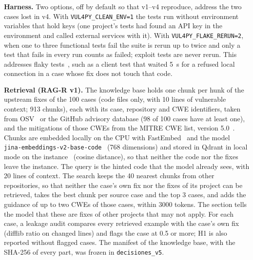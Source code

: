 \documentclass[ai,article,submit,oneauthor]{Definitions/mdpi}
\begin{document}
\textbf{Harness.} Two options, off by default so that v1--v4 reproduce, address the two cases lost in v4. With \texttt{VUL4PY\_CLEAN\_ENV=1} the tests run without environment variables that hold keys (one project's tests had found an API key in the environment and called external services with it). With \texttt{VUL4PY\_FLAKE\_RERUN=2}, when one to three functional tests fail the suite is rerun up to twice and only a test that fails in every run counts as failed; exploit tests are never rerun. This addresses flaky tests~\cite{Luo2014EmpiricalAnalysisFlaky}, such as a client test that waited 5~s for a refused local connection in a case whose fix does not touch that code.

\textbf{Retrieval (RAG-R v1).} The knowledge base holds one chunk per hunk of the upstream fixes of the 100 cases (code files only, with 10 lines of vulnerable context; 913 chunks), each with its case, repository and CWE identifiers, taken from OSV~\cite{OpenSSF2026OsvSchema} or the GitHub advisory database (98 of 100 cases have at least one), and the mitigations of those CWEs from the MITRE CWE list, version 5.0~\cite{MITRE2026CweList}. Chunks are embedded locally on the CPU with FastEmbed~\cite{Qdrant2026FastEmbed} and the model \texttt{jina-embeddings-v2-base-code}~\cite{Gunther2023JinaEmbeddings2} (768 dimensions) and stored in Qdrant in local mode on the instance~\cite{Qdrant2026QdrantClient} (cosine distance), so that neither the code nor the fixes leave the instance. The query is the hinted code that the model already sees, with 20 lines of context. The search keeps the 40 nearest chunks from other repositories, so that neither the case's own fix nor the fixes of its project can be retrieved, takes the best chunk per source case and the top 3 cases, and adds the guidance of up to two CWEs of those cases, within 3000 tokens. The section tells the model that these are fixes of other projects that may not apply. For each case, a leakage audit compares every retrieved example with the case's own fix (difflib ratio on changed lines) and flags the case at 0.5 or more; H1 is also reported without flagged cases. The manifest of the knowledge base, with the SHA-256 of every part, was frozen in \texttt{decisiones\_v5}.
\end{document}
